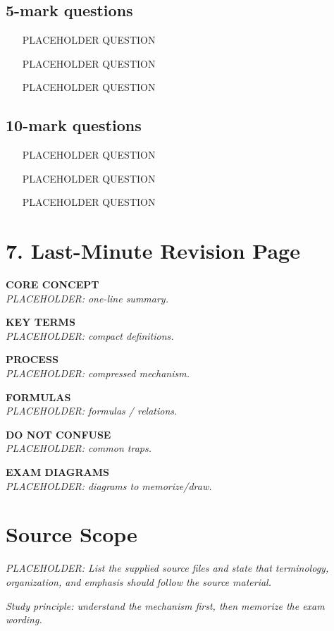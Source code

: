 \documentclass[11pt,a4paper]{article}
\begin{document}
\subsection*{5-mark questions}
\begin{enumerate}
    \item [PLACEHOLDER QUESTION]
    \item [PLACEHOLDER QUESTION]
    \item [PLACEHOLDER QUESTION]
\end{enumerate}

\subsection*{10-mark questions}
\begin{enumerate}
    \item [PLACEHOLDER QUESTION]
    \item [PLACEHOLDER QUESTION]
    \item [PLACEHOLDER QUESTION]
\end{enumerate}

\section{7. Last-Minute Revision Page}

\begin{multicols}{2}
\textbf{CORE CONCEPT}\\
\textit{PLACEHOLDER: one-line summary.}

\textbf{KEY TERMS}\\
\textit{PLACEHOLDER: compact definitions.}

\textbf{PROCESS}\\
\textit{PLACEHOLDER: compressed mechanism.}

\textbf{FORMULAS}\\
\textit{PLACEHOLDER: formulas / relations.}

\textbf{DO NOT CONFUSE}\\
\textit{PLACEHOLDER: common traps.}

\textbf{EXAM DIAGRAMS}\\
\textit{PLACEHOLDER: diagrams to memorize/draw.}
\end{multicols}

\section*{Source Scope}
\textit{PLACEHOLDER: List the supplied source files and state that terminology, organization, and emphasis should follow the source material.}

\vfill
\begin{center}
\textit{Study principle: understand the mechanism first, then memorize the exam wording.}
\end{center}
\end{document}
